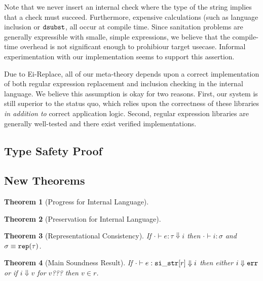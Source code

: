 \documentclass[10pt,preprint]{sigplanconf}
\newtheorem{thm}{Theorem}
\theoremstyle{definition}
\newcommand{\trep}{{\tt rep}}
\newcommand{\sistr}[1]{{\tt si\_str}[#1]}
\newcommand{\strin}[1]{\sistr{#1}}
\newcommand{\err}{{\tt err}}
\newcommand{\treduces}{ \Downarrow }
\newcommand{\sreduces}{ \Downarrow }
\begin{document}
\twocolumn

Note that we never insert an internal check where the type of the string implies
that a check must succeed. Furthermore, expensive calculations (such as language
inclusion or ${\tt dsubst}$, all occur at compile time.
Since sanitation problems are generally expressible with smalle, simple expressions,
we believe that the compile-time overhead is not significant enough to prohibiour target usecase. Informal experimentation with our implementation seems to
support this assertion.

Due to Ei-Replace, all of our meta-theory depends upon a correct implementation
of both regular expression replacement and inclusion checking in the internal language.
We believe this assumption is okay for two reasons. First, our system is still
superior to the status quo, which relies upon the correctness of these libraries
\emph{in addition to} correct application logic. Second, regular expression libraries are
generally well-tested and there exist verified implementations.

\subsection{Type Safety Proof}

\subsection{New Theorems}

\begin{thm}[Progress for Internal Language]
\end{thm}

\begin{thm}[Preservation for Internal Language]
\end{thm}


\begin{thm}[Representational Consistency]
If $\cdot \vdash e : \tau \sreduces i$ then $\cdot \vdash i : \sigma$ and $\sigma \equiv \trep(\tau)$.
\end{thm}

\begin{thm}[Main Soundness Result]
  If $\cdot \vdash e : \strin{r} \sreduces i$ then either $i \treduces \err$ or
  if $i \sreduces v$ for $v$??? then $v \in r$.
\end{thm}
\end{document}
